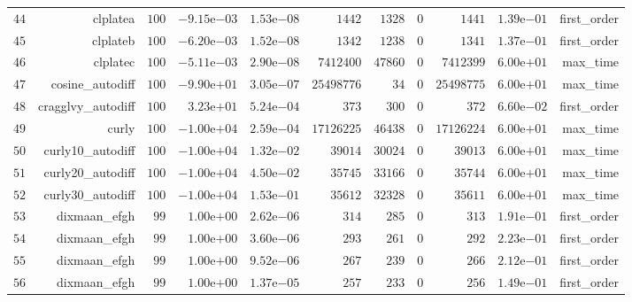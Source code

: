 \documentclass[varwidth=20cm,crop=true]{standalone}
\begin{document}
\begin{longtable}{rrrrrrrrrrr}
  \(    44\) & clplatea & \(   100\) & \(-9.15\)e\(-03\) & \( 1.53\)e\(-08\) & \(  1442\) & \(  1328\) & \(     0\) & \(  1441\) & \( 1.39\)e\(-01\) & first\_order \\
  \(    45\) & clplateb & \(   100\) & \(-6.20\)e\(-03\) & \( 1.52\)e\(-08\) & \(  1342\) & \(  1238\) & \(     0\) & \(  1341\) & \( 1.37\)e\(-01\) & first\_order \\
  \(    46\) & clplatec & \(   100\) & \(-5.11\)e\(-03\) & \( 2.90\)e\(-08\) & \(7412400\) & \( 47860\) & \(     0\) & \(7412399\) & \( 6.00\)e\(+01\) & max\_time \\
  \(    47\) & cosine\_autodiff & \(   100\) & \(-9.90\)e\(+01\) & \( 3.05\)e\(-07\) & \(25498776\) & \(    34\) & \(     0\) & \(25498775\) & \( 6.00\)e\(+01\) & max\_time \\
  \(    48\) & cragglvy\_autodiff & \(   100\) & \( 3.23\)e\(+01\) & \( 5.24\)e\(-04\) & \(   373\) & \(   300\) & \(     0\) & \(   372\) & \( 6.60\)e\(-02\) & first\_order \\
  \(    49\) & curly & \(   100\) & \(-1.00\)e\(+04\) & \( 2.59\)e\(-04\) & \(17126225\) & \( 46438\) & \(     0\) & \(17126224\) & \( 6.00\)e\(+01\) & max\_time \\
  \(    50\) & curly10\_autodiff & \(   100\) & \(-1.00\)e\(+04\) & \( 1.32\)e\(-02\) & \( 39014\) & \( 30024\) & \(     0\) & \( 39013\) & \( 6.00\)e\(+01\) & max\_time \\
  \(    51\) & curly20\_autodiff & \(   100\) & \(-1.00\)e\(+04\) & \( 4.50\)e\(-02\) & \( 35745\) & \( 33166\) & \(     0\) & \( 35744\) & \( 6.00\)e\(+01\) & max\_time \\
  \(    52\) & curly30\_autodiff & \(   100\) & \(-1.00\)e\(+04\) & \( 1.53\)e\(-01\) & \( 35612\) & \( 32328\) & \(     0\) & \( 35611\) & \( 6.00\)e\(+01\) & max\_time \\
  \(    53\) & dixmaan\_efgh & \(    99\) & \( 1.00\)e\(+00\) & \( 2.62\)e\(-06\) & \(   314\) & \(   285\) & \(     0\) & \(   313\) & \( 1.91\)e\(-01\) & first\_order \\
  \(    54\) & dixmaan\_efgh & \(    99\) & \( 1.00\)e\(+00\) & \( 3.60\)e\(-06\) & \(   293\) & \(   261\) & \(     0\) & \(   292\) & \( 2.23\)e\(-01\) & first\_order \\
  \(    55\) & dixmaan\_efgh & \(    99\) & \( 1.00\)e\(+00\) & \( 9.52\)e\(-06\) & \(   267\) & \(   239\) & \(     0\) & \(   266\) & \( 2.12\)e\(-01\) & first\_order \\
  \(    56\) & dixmaan\_efgh & \(    99\) & \( 1.00\)e\(+00\) & \( 1.37\)e\(-05\) & \(   257\) & \(   233\) & \(     0\) & \(   256\) & \( 1.49\)e\(-01\) & first\_order \\

\end{longtable}
\end{document}
